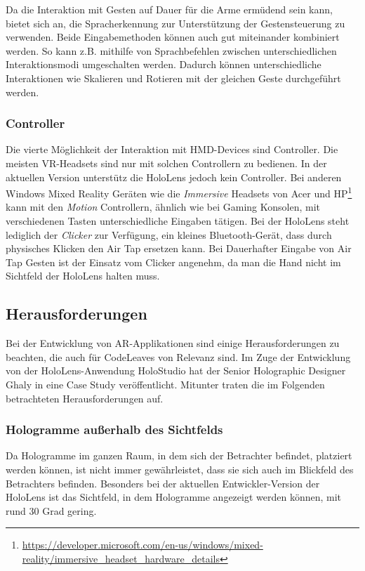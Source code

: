 Da die Interaktion mit Gesten auf Dauer für die Arme ermüdend sein kann, bietet sich an, die Spracherkennung zur Unterstützung der Gestensteuerung zu verwenden. Beide Eingabemethoden können auch gut miteinander kombiniert werden. So kann z.B. mithilfe von Sprachbefehlen zwischen unterschiedlichen Interaktionsmodi umgeschalten werden. Dadurch können unterschiedliche Interaktionen wie Skalieren und Rotieren mit der gleichen Geste durchgeführt werden.

\subsubsection*{Controller}
Die vierte Möglichkeit der Interaktion mit HMD-Devices sind Controller. Die meisten VR-Headsets sind nur mit solchen Controllern zu bedienen. In der aktuellen Version unterstütz die HoloLens jedoch kein Controller. Bei anderen Windows Mixed Reality Geräten wie die \textit{Immersive} Headsets von Acer und HP\footnote{\url{https://developer.microsoft.com/en-us/windows/mixed-reality/immersive_headset_hardware_details}} kann mit den \textit{Motion} Controllern, ähnlich wie bei Gaming Konsolen, mit verschiedenen Tasten unterschiedliche Eingaben tätigen. Bei der HoloLens steht lediglich der \textit{Clicker} zur Verfügung, ein kleines Bluetooth-Gerät, dass durch physisches Klicken den Air Tap ersetzen kann. Bei Dauerhafter Eingabe von Air Tap Gesten ist der Einsatz vom Clicker angenehm, da man die Hand nicht im Sichtfeld der HoloLens halten muss.

\subsection{Herausforderungen}

Bei der Entwicklung von AR-Applikationen sind einige Herausforderungen zu beachten, die auch für CodeLeaves von Relevanz sind. Im Zuge der Entwicklung von der HoloLens-Anwendung HoloStudio hat der Senior Holographic Designer Ghaly in \cite{windows2017casestudy3} eine Case Study veröffentlicht. Mitunter traten die im Folgenden betrachteten Herausforderungen auf.

\subsubsection*{Hologramme außerhalb des Sichtfelds}

Da Hologramme im ganzen Raum, in dem sich der Betrachter befindet, platziert werden können, ist nicht immer gewährleistet, dass sie sich auch im Blickfeld des Betrachters befinden. Besonders bei der aktuellen Entwickler-Version der HoloLens ist das Sichtfeld, in dem Hologramme angezeigt werden können, mit rund 30 Grad \cite{czerulla2017microsoft} gering.

